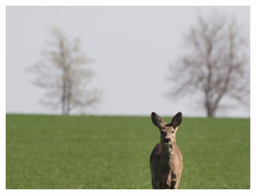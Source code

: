 \begin{figure}[H]
\begin{subfigure}{0.32\textwidth}
      \centering
      \includegraphics[scale=1.0]{obrazky/badcropFang.jpg}
      \caption{}
    \end{subfigure}
    \vspace{1pt}
    

\end{figure}

